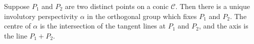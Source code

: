 Suppose $P_1$ and $P_2$ are two distinct points on a conic $\mathcal{C}$. Then there is a unique involutory perspectivity $\alpha$ in the orthogonal group which fixes $P_1$ and $P_2$. The centre of $\alpha$ is the intersection of the tangent lines at $P_1$ and $P_2$, and the axis is the line $P_1 + P_2$.
